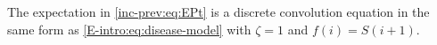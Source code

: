 \documentclass[thesis.tex]{subfiles}
\begin{document}



The expectation in \cref{inc-prev:eq:EPt} is a discrete convolution equation in the same form as \cref{E-intro:eq:disease-model} with $\zeta = 1$ and $f(i) = S(i+1)$.
\end{document}
